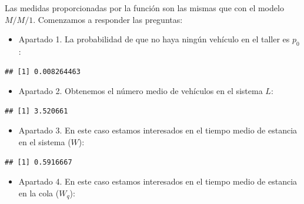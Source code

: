 \documentclass[
]{book}
\newenvironment{Shaded}{\begin{snugshade}}{\end{snugshade}}
\newcommand{\DecValTok}[1]{\textcolor[rgb]{0.00,0.00,0.81}{#1}}
\newcommand{\NormalTok}[1]{#1}
\newcommand{\SpecialCharTok}[1]{\textcolor[rgb]{0.00,0.00,0.00}{#1}}
\providecommand{\tightlist}{%
  \setlength{\itemsep}{0pt}\setlength{\parskip}{0pt}}
\theoremstyle{definition}
\theoremstyle{definition}
\theoremstyle{definition}
\theoremstyle{definition}
\theoremstyle{remark}
\begin{document}
Las medidas proporcionadas por la función son las mismas que con el modelo \(M/M/1\). Comenzamos a responder las preguntas:

\begin{itemize}
\tightlist
\item
  Apartado 1. La probabilidad de que no haya ningún vehículo en el taller es \(p_0\):
\end{itemize}

\begin{Shaded}
\end{Shaded}

\begin{verbatim}
## [1] 0.008264463
\end{verbatim}

\begin{itemize}
\tightlist
\item
  Apartado 2. Obtenemos el número medio de vehículos en el sistema \(L\):
\end{itemize}

\begin{Shaded}
\end{Shaded}

\begin{verbatim}
## [1] 3.520661
\end{verbatim}

\begin{itemize}
\tightlist
\item
  Apartado 3. En este caso estamos interesados en el tiempo medio de estancia en el sistema (\(W\)):
\end{itemize}

\begin{Shaded}
\end{Shaded}

\begin{verbatim}
## [1] 0.5916667
\end{verbatim}

\begin{itemize}
\tightlist
\item
  Apartado 4. En este caso estamos interesados en el tiempo medio de estancia en la cola (\(W_q\)):
\end{itemize}
\end{document}
